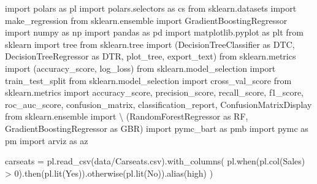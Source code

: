 \documentclass[
  letterpaper,
  DIV=11,
  numbers=noendperiod]{scrreprt}
\newenvironment{Shaded}{\begin{snugshade}}{\end{snugshade}}
\newcommand{\DecValTok}[1]{\textcolor[rgb]{0.68,0.00,0.00}{#1}}
\newcommand{\ImportTok}[1]{\textcolor[rgb]{0.00,0.46,0.62}{#1}}
\newcommand{\NormalTok}[1]{\textcolor[rgb]{0.00,0.23,0.31}{#1}}
\newcommand{\OperatorTok}[1]{\textcolor[rgb]{0.37,0.37,0.37}{#1}}
\newcommand{\StringTok}[1]{\textcolor[rgb]{0.13,0.47,0.30}{#1}}
\begin{document}
\begin{Shaded}
\begin{Highlighting}[]
\ImportTok{import}\NormalTok{ polars }\ImportTok{as}\NormalTok{ pl }
\ImportTok{import}\NormalTok{ polars.selectors }\ImportTok{as}\NormalTok{ cs}
\ImportTok{from}\NormalTok{ sklearn.datasets }\ImportTok{import}\NormalTok{ make\_regression}
\ImportTok{from}\NormalTok{ sklearn.ensemble }\ImportTok{import}\NormalTok{ GradientBoostingRegressor}
\ImportTok{import}\NormalTok{ numpy }\ImportTok{as}\NormalTok{ np}
\ImportTok{import}\NormalTok{ pandas }\ImportTok{as}\NormalTok{ pd }
\ImportTok{import}\NormalTok{ matplotlib.pyplot }\ImportTok{as}\NormalTok{ plt}
\ImportTok{from}\NormalTok{ sklearn }\ImportTok{import}\NormalTok{ tree}
\ImportTok{from}\NormalTok{ sklearn.tree }\ImportTok{import}\NormalTok{ (DecisionTreeClassifier }\ImportTok{as}\NormalTok{ DTC,}
\NormalTok{                          DecisionTreeRegressor }\ImportTok{as}\NormalTok{ DTR,}
\NormalTok{                          plot\_tree,}
\NormalTok{                          export\_text)}
\ImportTok{from}\NormalTok{ sklearn.metrics }\ImportTok{import}\NormalTok{ (accuracy\_score,}
\NormalTok{                             log\_loss)}
\ImportTok{from}\NormalTok{ sklearn.model\_selection }\ImportTok{import}\NormalTok{ train\_test\_split}
\ImportTok{from}\NormalTok{ sklearn.model\_selection }\ImportTok{import}\NormalTok{ cross\_val\_score}
\ImportTok{from}\NormalTok{ sklearn.metrics }\ImportTok{import}\NormalTok{ accuracy\_score, precision\_score, recall\_score, f1\_score, roc\_auc\_score, confusion\_matrix, classification\_report, ConfusionMatrixDisplay                            }
\ImportTok{from}\NormalTok{ sklearn.ensemble }\ImportTok{import} \OperatorTok{\textbackslash{}}
\NormalTok{     (RandomForestRegressor }\ImportTok{as}\NormalTok{ RF,}
\NormalTok{      GradientBoostingRegressor }\ImportTok{as}\NormalTok{ GBR)}
\ImportTok{import}\NormalTok{ pymc\_bart }\ImportTok{as}\NormalTok{ pmb}
\ImportTok{import}\NormalTok{ pymc }\ImportTok{as}\NormalTok{ pm }
\ImportTok{import}\NormalTok{ arviz }\ImportTok{as}\NormalTok{ az}


\NormalTok{carseats }\OperatorTok{=}\NormalTok{ pl.read\_csv(}\StringTok{\textquotesingle{}data/Carseats.csv\textquotesingle{}}\NormalTok{).with\_columns(}
\NormalTok{    pl.when(pl.col(}\StringTok{\textquotesingle{}Sales\textquotesingle{}}\NormalTok{) }\OperatorTok{\textgreater{}} \DecValTok{0}\NormalTok{).then(pl.lit(}\StringTok{\textquotesingle{}Yes\textquotesingle{}}\NormalTok{)).otherwise(pl.lit(}\StringTok{\textquotesingle{}No\textquotesingle{}}\NormalTok{)).alias(}\StringTok{\textquotesingle{}high\textquotesingle{}}\NormalTok{)}
\NormalTok{)}
\end{Highlighting}
\end{Shaded}
\end{document}

